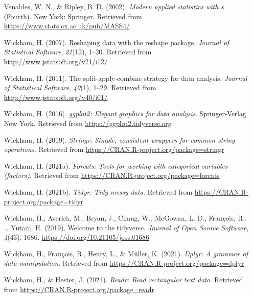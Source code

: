 \documentclass[
  man]{apa6}
\newlength{\cslhangindent}
\newlength{\cslentryspacingunit} %
\newenvironment{CSLReferences}[2] %
 {%
  \setlength{\parindent}{0pt}
  \ifodd #1
  \let\oldpar\par
  \def\par{\hangindent=\cslhangindent\oldpar}
  \fi
  \setlength{\parskip}{#2\cslentryspacingunit}
 }%
 {}
\begin{document}
\begin{CSLReferences}{1}{0}
\leavevmode{}%
Venables, W. N., \& Ripley, B. D. (2002). \emph{Modern applied statistics with s} (Fourth). New York: Springer. Retrieved from \url{https://www.stats.ox.ac.uk/pub/MASS4/}

\leavevmode{}%
Wickham, H. (2007). Reshaping data with the {reshape} package. \emph{Journal of Statistical Software}, \emph{21}(12), 1--20. Retrieved from \url{http://www.jstatsoft.org/v21/i12/}

\leavevmode{}%
Wickham, H. (2011). The split-apply-combine strategy for data analysis. \emph{Journal of Statistical Software}, \emph{40}(1), 1--29. Retrieved from \url{http://www.jstatsoft.org/v40/i01/}

\leavevmode{}%
Wickham, H. (2016). \emph{ggplot2: Elegant graphics for data analysis}. Springer-Verlag New York. Retrieved from \url{https://ggplot2.tidyverse.org}

\leavevmode{}%
Wickham, H. (2019). \emph{Stringr: Simple, consistent wrappers for common string operations}. Retrieved from \url{https://CRAN.R-project.org/package=stringr}

\leavevmode{}%
Wickham, H. (2021a). \emph{Forcats: Tools for working with categorical variables (factors)}. Retrieved from \url{https://CRAN.R-project.org/package=forcats}

\leavevmode{}%
Wickham, H. (2021b). \emph{Tidyr: Tidy messy data}. Retrieved from \url{https://CRAN.R-project.org/package=tidyr}

\leavevmode{}%
Wickham, H., Averick, M., Bryan, J., Chang, W., McGowan, L. D., François, R., \ldots{} Yutani, H. (2019). Welcome to the {tidyverse}. \emph{Journal of Open Source Software}, \emph{4}(43), 1686. \url{https://doi.org/10.21105/joss.01686}

\leavevmode{}%
Wickham, H., François, R., Henry, L., \& Müller, K. (2021). \emph{Dplyr: A grammar of data manipulation}. Retrieved from \url{https://CRAN.R-project.org/package=dplyr}

\leavevmode{}%
Wickham, H., \& Hester, J. (2021). \emph{Readr: Read rectangular text data}. Retrieved from \url{https://CRAN.R-project.org/package=readr}


\end{CSLReferences}
\end{document}
